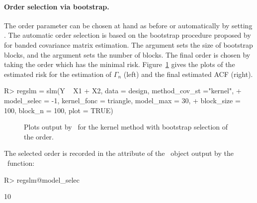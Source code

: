 \paragraph{Order selection via bootstrap.} The  order  parameter can be chosen at hand as before or automatically by setting . The automatic order selection is based on the bootstrap procedure proposed by \cite{wu2009banding} for banded covariance matrix estimation. The  argument sets the size of bootstrap blocks, and the  argument sets the number of blocks. The final order is chosen by taking the order which has the minimal risk.
Figure~\ref{fig:kernelauto} gives the plots of the estimated risk for the estimation of $\Gamma_{n}$ (left) and the final estimated ACF (right).
\begin{Schunk}
\begin{Sinput}
R> regslm = slm(Y ~ X1 + X2, data = design, method_cov_st ="kernel",
+  	model_selec = -1, kernel_fonc = triangle, model_max = 30,
+  	block_size = 100, block_n = 100, plot = TRUE)
\end{Sinput}
\end{Schunk}
\begin{figure}[ht]
     \centering
     \caption{Plots output by \slmf~for the kernel method with bootstrap selection of the order.}
     \label{fig:kernelauto}
\end{figure}
The selected order is recorded in the  attribute of the \slmf~object output by the \slmf~function:
\begin{Schunk}
\begin{Sinput}
R> regslm@model_selec
\end{Sinput}
\begin{Soutput}
[1] 10
\end{Soutput}
\end{Schunk}

